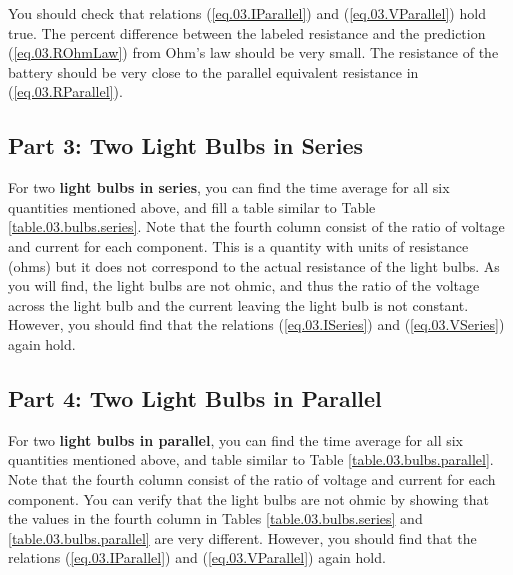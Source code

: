 You should check that relations (\ref{eq.03.IParallel}) and (\ref{eq.03.VParallel}) hold true. The percent difference between the labeled resistance and the prediction (\ref{eq.03.ROhmLaw}) from Ohm's law should be very small. The resistance of the battery should be very close to the parallel equivalent resistance in (\ref{eq.03.RParallel}).
\subsection{Part 3: Two Light Bulbs in Series}
For two \textbf{light bulbs in series}, you can find the time average for all six quantities mentioned above, and fill a table similar to Table \ref{table.03.bulbs.series}. Note that the fourth column consist of the ratio of voltage and current for each component. This is a quantity with units of resistance (ohms) but it does not correspond to the actual resistance of the light bulbs. As you will find, the light bulbs are not ohmic, and thus the ratio of the voltage across the light bulb and the current leaving the light bulb is not constant. However, you should find that the relations (\ref{eq.03.ISeries}) and (\ref{eq.03.VSeries}) again hold.
\subsection{Part 4: Two Light Bulbs in Parallel}
For two \textbf{light bulbs in parallel}, you can find the time average for all six quantities mentioned above, and table similar to Table \ref{table.03.bulbs.parallel}. Note that the fourth column consist of the ratio of voltage and current for each component. You can verify that the light bulbs are not ohmic by showing that the values in the fourth column in Tables \ref{table.03.bulbs.series} and \ref{table.03.bulbs.parallel} are very different. However, you should find that the relations (\ref{eq.03.IParallel}) and (\ref{eq.03.VParallel}) again hold.
